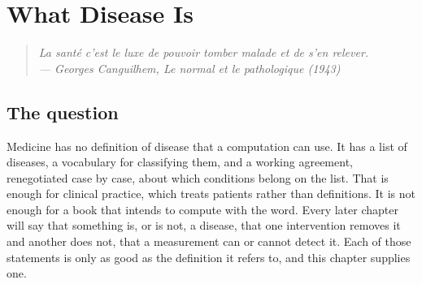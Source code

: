 
\chapter{What Disease Is}
\label{ch:what-disease-is}

\begin{quote}
\itshape
La sant\'e c'est le luxe de pouvoir tomber malade et de s'en relever.
\upshape\medskip\\
\hfill --- Georges Canguilhem, \textit{Le normal et le pathologique} (1943)
\end{quote}

\section{The question}
\label{c1:sec-question}

Medicine has no definition of disease that a computation can use. It has a
list of diseases, a vocabulary for classifying them, and a working
agreement, renegotiated case by case, about which conditions belong on the
list. That is enough for clinical practice, which treats patients rather
than definitions. It is not enough for a book that intends to compute with
the word. Every later chapter will say that something is, or is not, a
disease, that one intervention removes it and another does not, that a
measurement can or cannot detect it. Each of those statements is only as
good as the definition it refers to, and this chapter supplies one.

